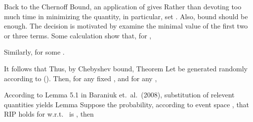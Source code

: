 Back to the Chernoff Bound, an application of  gives
Rather than devoting too much time in minimizing the quantity, in particular, set .
Also, bound  should be enough.
The decision is motivated by examine the minimal value of the first two or three terms.
Some calculation show that, for ,


Similarly, for some .


It follows that
Thus, by Chebyshev bound,
\Result
{Theorem}
{
Let  be generated randomly according to ().
Then, for any fixed , and for any ,
}

According to Lemma 5.1 in Baraniuk et.\ al.\ (2008), substitution of relevent quantities yields
\Result
{Lemma}
{
Suppose the probability, according to event space , that RIP holds for  w.r.t.\  is , then
}

\stopsubsection
\stopsection



